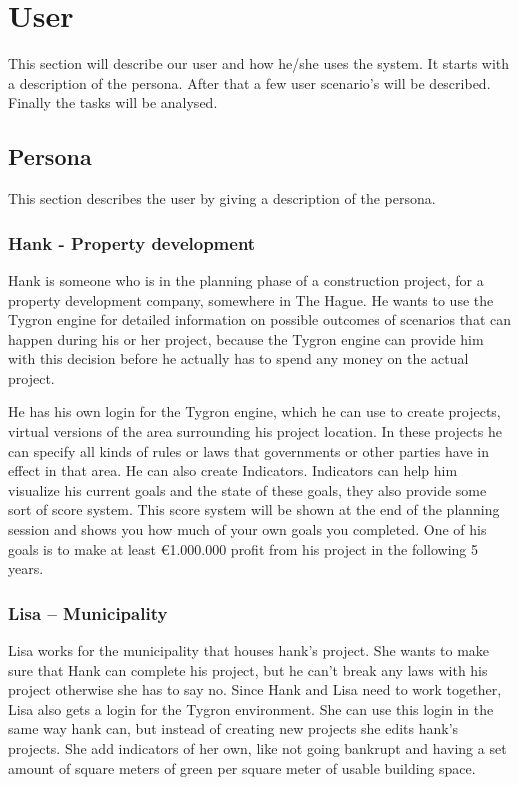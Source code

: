 \section{User}
This section will describe our user and how he/she uses the system. 
It starts with a description of the persona. 
After that a few user scenario's will be described.
Finally the tasks will be analysed.

\subsection{Persona}
This section describes the user by giving a description of the persona.
\subsubsection*{Hank - Property development}
Hank is someone who is in the planning phase of a construction project, for a property development company, somewhere in The Hague. He wants to use the Tygron engine for detailed information on possible outcomes of scenarios that can happen during his or her project, because the Tygron engine can provide him with this decision before he actually has to spend any money on the actual project. 

He has his own login for the Tygron engine, which he can use to create projects, virtual versions of the area surrounding his project location. In these projects he can specify all kinds of rules or laws that governments or other parties have in effect in that area. He can also create Indicators. Indicators can help him visualize his current goals and the state of these goals, they also provide some sort of score system. This score system will be shown at the end of the planning session and shows you how much of your own goals you completed. One of his goals is to make at least €1.000.000 profit from his project in the following 5 years.

\subsubsection*{Lisa – Municipality}
Lisa works for the municipality that houses hank’s project. She wants to make sure that Hank can complete his project, but he can’t break any laws with his project otherwise she has to say no. Since Hank and Lisa need to work together, Lisa also gets a login for the Tygron environment. She can use this login in the same way hank can, but instead of creating new projects she edits hank’s projects. She add indicators of her own, like not going bankrupt and having a set amount of square meters of green per square meter of usable building space.

